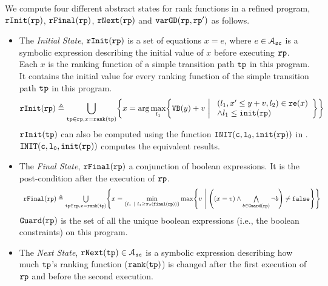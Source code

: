 \begin{defn}
  \label{def:alg-absstate}
  We compute four different abstract states for rank functions in a refined program, $\mathtt{rInit}(\mathtt{rp})$, $\mathtt{rFinal}(\mathtt{rp})$, $\mathtt{rNext}(\mathtt{rp})$ and $\mathtt{varGD}(\mathtt{rp}, \mathtt{rp}')$ as follows.
 \begin{itemize}
  \item The \emph{Initial State}, 
  $\mathtt{rInit}(\mathtt{rp})$ is a set of equations $x = e$, where $e \in \mathcal{A}_{\mathtt{sc}}$ is a
  symbolic expression describing the initial value of $x$ before executing $\mathtt{rp}$.
  Each $x$ is the ranking function of a simple transition path $\mathtt{tp}$ in this program. 
  It contains the initial value for every ranking function of the simple transition path $\mathtt{tp}$ in this program.
 \[
   \rfinit(\rprog) \triangleq 
   \bigcup_{\tpath \in \rprog, x = \locbound(\tpath)}
   \left \{ 
   x = \arg\max_{l_1}\left\{
     \varinvar(y) + v ~\middle\vert~ 
     \begin{array}{l} 
       (l_1, x' \leq y + v, l_2) \in \reset(x) 
       \\
     \land l_1 \leq \absinit(\rprog)
   \end{array}
   \right\}
   \right\}
   \]
 $\mathtt{rInit}(\mathtt{tp})$ can also be computed using the function $\mathtt{INIT(c, l_0, \mathtt{init}(\mathtt{rp}))}$ in \cite{GulwaniJK09}. 
 $\mathtt{INIT(c, l_0, \mathtt{init}(\mathtt{rp}))}$ computes the equivalent results.
 \item  The \emph{Final State}, $\mathtt{rFinal}(\mathtt{rp})$ a conjunction of boolean expressions.
 It is the post-condition
 after the execution of $\mathtt{rp}$.
 \[
  \begin{array}{l} 
    \rffinal(\rprog) \triangleq 
   \bigcup\limits_{\tpath \in \rprog, x = \locbound(\tpath)}
   \left \{ 
   x = \min\limits_{ \left\{ l_1 ~|~ l_1 \geq \pi_2(\absfinal(\rprog)) \right\} }
   \max\left\{
     v ~\middle\vert~ 
     \left( (x = v) \land \bigwedge\limits_{b \in \kw{Guard}(\rprog)} \neg b \right) \neq \efalse
   \right\}
   \right\}
  \end{array}
  \]
  $\mathtt{Guard}(\mathtt{rp})$ is the set of all the unique boolean expressions (i.e., the boolean constraints) on this program.
 \item The \emph{Next State}, $\mathtt{rNext}(\mathtt{tp}) \in \mathcal{A}_{\mathtt{sc}}$ 
 is a
 symbolic expression describing how much $\mathtt{tp}$'s ranking function ($\mathtt{rank}(\mathtt{tp})$) is changed after the first execution of $\mathtt{rp}$ and before the second execution.
 \[
   \begin{array}{l}

\end{array}\]
\end{itemize}
\end{defn}
